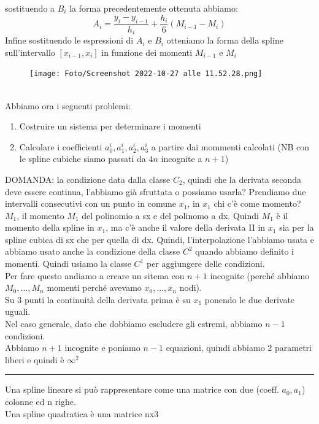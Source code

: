 \documentclass[a4paper, portrait]{book}
\numberwithin{equation}{chapter} %
\newcommand*\sepline{%
  \begin{center}
    \rule[1ex]{.5\textwidth}{.5pt}
  \end{center}}
\begin{document}
sostituendo a $B_i$ la forma precedentemente ottenuta abbiamo:
\begin{equation}
    A_i = \frac{y_i - y_{i-1}}{h_i} + \frac{h_i}{6}(M_{i-1}-M_i)
\end{equation}
\newpage
Infine sostituendo le espressioni di $A_i$ e $B_i$ otteniamo la forma della spline sull'intervallo $[x_{i-1},x_i]$ in funzione dei momenti $M_{i-1}$ e $M_i$
\begin{figure}[h!]
    \centering
    \texttt{[image: Foto/Screenshot 2022-10-27 alle 11.52.28.png]}\
    \caption{}
\end{figure}
\\Abbiamo ora i seguenti problemi:
\begin{enumerate}
    \item Costruire un sistema per determinare i momenti
    \item Calcolare i coefficienti $a_0^i, a_1^i,a_2^i,a_3^i$ a partire dai mommenti calcolati (NB con le spline cubiche siamo passati da $4n$ incognite a $n+1$)
\end{enumerate}
DOMANDA: la condizione data dalla classe $C_2$, quindi che la derivata seconda deve essere continua, l'abbiamo già sfruttata o possiamo usarla? Prendiamo due intervalli consecutivi con un punto in comune $x_1$, in $x_1$ chi c'è come momento? $M_1$, il momento $M_1$ del polinomio a sx e del polinomo a dx. Quindi $M_1$ è il momento della spline in $x_1$, ma c'è anche il valore della derivata II in $x_1$ sia per la spline cubica di sx che per quella di dx. Quindi, l'interpolazione l'abbiamo usata e abbiamo usato anche la condizione della classe $C^2$ quando abbiamo definito i momenti. Quindi usiamo la classe $C^1$ per aggiungere delle condizioni.\\
Per fare questo andiamo a creare un sitema con $n+1$ incognite (perché abbiamo $M_0,...,M_n$ momenti perché avevamo $x_0,...,x_n$ nodi).\\
Su 3 punti la continuità della derivata prima è su $x_1$ ponendo le due derivate uguali.\\
Nel caso generale, dato che dobbiamo escludere gli estremi, abbiamo $n-1$ condizioni.\\
Abbiamo $n+1$ incognite e poniamo $n-1$ equazioni, quindi abbiamo 2 parametri liberi e quindi è $\infty^2$
\sepline{}
Una spline lineare si può rappresentare come una matrice con due (coeff. $a_0,a_1$) colonne ed n righe.\\
Una spline quadratica è una matrice nx3\\
\end{document}
